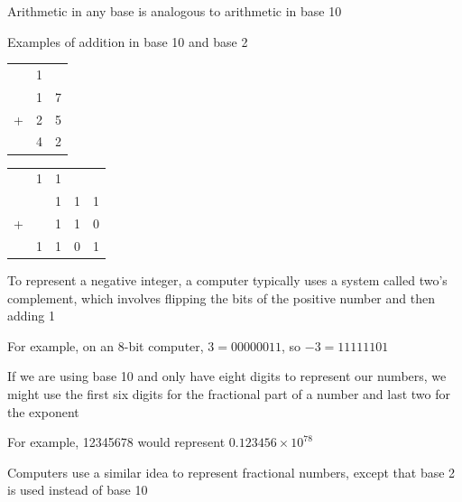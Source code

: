 \documentclass[8pt,a4paper,compress]{beamer}
\begin{document}
\begin{frame}[fragile]
\pause

Arithmetic in any base is analogous to arithmetic in base 10

\pause
\bigskip

Examples of addition in base 10 and base 2
\begin{center}
\begin{tabular}{ccc}
  & 1 &   \\ 
  & 1 & 7 \\
+ & 2 & 5 \\
\hline
  & 4 & 2 \\
\end{tabular}\hspace{2cm} \begin{tabular}{ccccc}
  & 1 & 1 &   \\ 
  &   & 1 & 1 & 1 \\
+ &   & 1 & 1 & 0 \\
\hline
  & 1 & 1 & 0 & 1 \\
\end{tabular}
\end{center}

\pause
\bigskip

To represent a negative integer, a computer typically uses a system called two's complement, which involves flipping the bits of the positive number and then adding 1

\pause
\bigskip

For example, on an 8-bit computer, $3 = 00000011$, so $-3 = 11111101$
\end{frame}

\begin{frame}[fragile]
\pause

If we are using base 10 and only have eight digits to represent our numbers, we might use the first six digits for the fractional part of a number and last two for the exponent  

\pause
\bigskip

For example, 12345678 would represent $0.123456 \times 10^{78}$

\pause
\bigskip

Computers use a similar idea to represent fractional numbers, except that base 2 is used instead of base 10
\end{frame}
\end{document}
